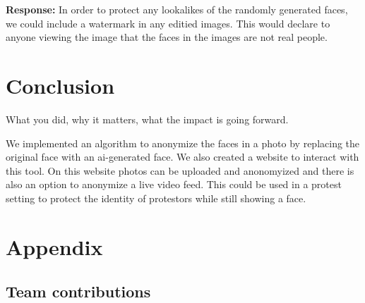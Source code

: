 \begin{enumerate}
    \textbf{Response:} In order to protect any lookalikes of the randomly generated faces, we could include a watermark in any editied images. This would declare to anyone viewing the image
    that the faces in the images are not real people.
\end{enumerate}




\section{Conclusion}

What you did, why it matters, what the impact is going forward.

We implemented an algorithm to anonymize the faces in a photo by replacing the original face with an ai-generated face.
We also created a website to interact with this tool. On this website photos can be uploaded and anonomyized and there
is also an option to anonymize a live video feed. This could be used in a protest setting to protect the identity of
protestors while still showing a face.



{\small


}

\section*{Appendix}

\subsection*{Team contributions}

